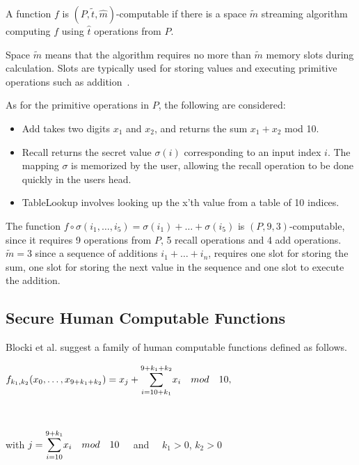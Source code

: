 \begin{definition}
    \label{ptm-computable}
    A function $f$ is $(P, \tilde t, \hat m)$-computable if there is a space $\tilde m$ streaming algorithm computing $f$ using $\hat t$ operations from $P$.
\end{definition}
\begin{remark}
    Space $\tilde m$ means that the algorithm requires no more than $\tilde m$ memory slots during calculation. Slots are typically used for storing values and executing primitive operations such as addition~\cite{space-complexity}.
\end{remark}



\noindent As for the primitive operations in $P$, the following are considered:
\begin{itemize}
    \item{Add} takes two digits $x_1$ and $x_2$, and returns the sum $x_1 + x_2$ mod 10.
    \item{Recall} returns the secret value $\sigma(i)$ corresponding to an input index $i$. The mapping $\sigma$ is memorized by the user, allowing the recall operation to be done quickly in the users head.
    \item{TableLookup} involves looking up the x'th value from a table of 10 indices.
\end{itemize}

\begin{example}
    The function $f \circ \sigma(i_1,\dots,i_5) = \sigma(i_1) + \dots + \sigma(i_5)$ is $(P,9,3)$-computable, since it requires 9 operations from $P$, 5 recall operations and 4 add operations. $\tilde m=3$ since a sequence of additions $i_1 + \dots + i_n$, requires one slot for storing the sum, one slot for storing the next value in the sequence and one slot to execute the addition.
\end{example}


\subsection{Secure Human Computable Functions}
Blocki et al. \cite{hcp-blocki} suggest a family of human computable functions defined as follows.
\centerline{ $ f_{k_1,k_2}(x_0,\dots,x_{9+k_1+k_2})= x_j + \mathlarger{\sum}\limits^{9+k_1+k_2}_{i=10+k_1} x_i \quad mod\quad 10,$}\\
\centerline{with $j = \mathlarger{\sum}\limits^{9+k_1}_{i=10} x_i \quad mod \quad 10\quad$ and $\quad k_1>0$, $k_2>0$ }
\vspace{2mm}



